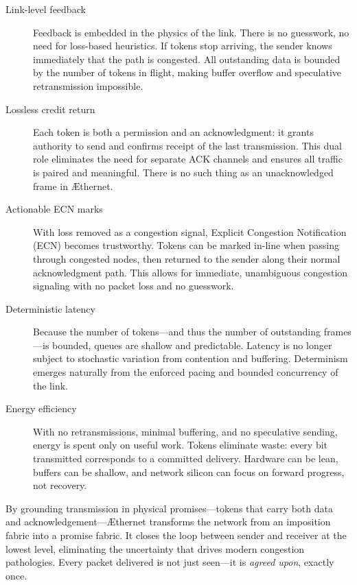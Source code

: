 \documentclass[../OAE-SPEC-MAIN.tex]{subfiles}
\begin{document}
\begin{description}

  \item[Link-level feedback]  
  Feedback is embedded in the physics of the link. There is no guesswork, no need for loss-based heuristics. If tokens stop arriving, the sender knows immediately that the path is congested. All outstanding data is bounded by the number of tokens in flight, making buffer overflow and speculative retransmission impossible.

  \item[Lossless credit return]  
  Each token is both a permission and an acknowledgment: it grants authority to send and confirms receipt of the last transmission. This dual role eliminates the need for separate ACK channels and ensures all traffic is paired and meaningful. There is no such thing as an unacknowledged frame in \AE thernet.

  \item[Actionable ECN marks]  
  With loss removed as a congestion signal, Explicit Congestion Notification (ECN) becomes trustworthy. Tokens can be marked in-line when passing through congested nodes, then returned to the sender along their normal acknowledgment path. This allows for immediate, unambiguous congestion signaling with no packet loss and no guesswork.

  \item[Deterministic latency]  
  Because the number of tokens—and thus the number of outstanding frames—is bounded, queues are shallow and predictable. Latency is no longer subject to stochastic variation from contention and buffering. Determinism emerges naturally from the enforced pacing and bounded concurrency of the link.

  \item[Energy efficiency]  
  With no retransmissions, minimal buffering, and no speculative sending, energy is spent only on useful work. Tokens eliminate waste: every bit transmitted corresponds to a committed delivery. Hardware can be lean, buffers can be shallow, and network silicon can focus on forward progress, not recovery.

\end{description}

By grounding transmission in physical promises—tokens that carry both data and acknowledgement—\AE thernet transforms the network from an imposition fabric into a promise fabric. It closes the loop between sender and receiver at the lowest level, eliminating the uncertainty that drives modern congestion pathologies. Every packet delivered is not just seen—it is \emph{agreed upon}, exactly once.
\end{document}
